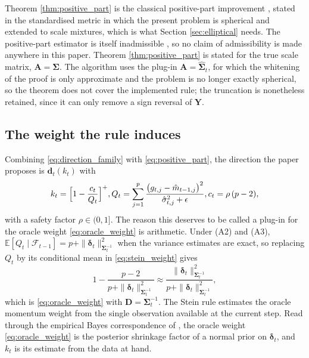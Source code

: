 \documentclass[a4paper,fleqn]{cas-dc}
\theoremstyle{plain}
\theoremstyle{definition}
\theoremstyle{remark}
\newcommand{\rev}[1]{#1}
\newcommand{\E}{\mathbb{E}}
\begin{document}
Theorem \ref{thm:positive_part} is the classical positive-part improvement \citep{baranchik1970, lehmann1998}, stated in the standardised metric in which the present problem is spherical and extended to scale mixtures, which is what Section \ref{sec:elliptical} needs. The positive-part estimator is itself inadmissible \citep{shao1994}, so no claim of admissibility is made anywhere in this paper. \rev{Theorem \ref{thm:positive_part} is stated for the true scale matrix, $\bm A=\bm\Sigma$. The algorithm uses the plug-in $\bm A=\widehat{\bm\Sigma}_t$, for which the whitening of the proof is only approximate and the problem is no longer exactly spherical, so the theorem does not cover the implemented rule; the truncation is nonetheless retained, since it can only remove a sign reversal of $\bm Y$.}

\subsection{The weight the rule induces}

Combining \eqref{eq:direction_family} with \eqref{eq:positive_part}, the direction the paper proposes is $\bm d_t(k_t)$ with
\begin{equation}
\label{eq:stein_weight}
k_t=\Bigl[1-\frac{c_t}{Q_t}\Bigr]^{+},
Q_t=\sum_{j=1}^{p}\frac{\bigl(g_{t,j}-\hat m_{t-1,j}\bigr)^2}{\hat\sigma^2_{t,j}+\epsilon},
c_t=\rho\,(p-2),
\end{equation}
with a safety factor $\rho\in(0,1]$. The reason this deserves to be called a plug-in for the oracle weight \eqref{eq:oracle_weight} is arithmetic. Under (A2) and (A3), $\E[Q_t\mid\mathcal F_{t-1}]=p+\|\bm\delta_t\|^2_{\bm\Sigma_t^{-1}}$ when the variance estimates are exact, so replacing $Q_t$ by its conditional mean in \eqref{eq:stein_weight} gives
\begin{equation}
1-\frac{p-2}{p+\|\bm\delta_t\|^2_{\bm\Sigma_t^{-1}}}
\approx
\frac{\|\bm\delta_t\|^2_{\bm\Sigma_t^{-1}}}{p+\|\bm\delta_t\|^2_{\bm\Sigma_t^{-1}}},
\end{equation}
which is \eqref{eq:oracle_weight} with $\bm D=\bm\Sigma_t^{-1}$. The Stein rule estimates the oracle momentum weight from the single observation available at the current step. Read through the empirical Bayes correspondence of \citet{efronmorris1973,efron2012}, the oracle weight \eqref{eq:oracle_weight} is the posterior shrinkage factor of a normal prior on $\bm\delta_t$, and $k_t$ is its estimate from the data at hand.
\end{document}
